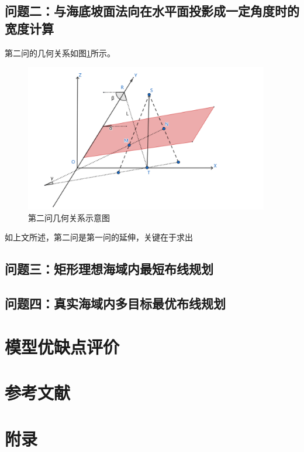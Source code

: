 \documentclass{article}
\begin{document}
\subsection{问题二：与海底坡面法向在水平面投影成一定角度时的宽度计算}
	\par 第二问的几何关系如图\ref{pro2Geo}所示。
	\begin{figure}[H]
		\centering  %
		\includegraphics[width=0.95\textwidth]{问题二//第二题几何关系示意图}
		\caption{第二问几何关系示意图}
		\label{pro2Geo}
	\end{figure}
	\par 如上文所述，第二问是第一问的延伸，关键在于求出





\subsection{问题三：矩形理想海域内最短布线规划}
\subsection{问题四：真实海域内多目标最优布线规划}

\section{模型优缺点评价}

\section*{参考文献}
% 
% 
	
	
\section*{附录}
	
	
	
	
	
\end{document}
